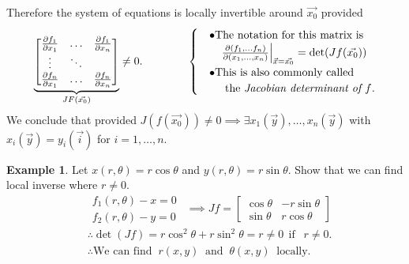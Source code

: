 \documentclass[
	12pt,
	]{article}
\theoremstyle{custom}
\theoremstyle{custom}
\theoremstyle{custom}
\theoremstyle{custom}
\theoremstyle{custom}
\theoremstyle{definition}
\newtheorem{example}{Example}[section]
\theoremstyle{example}
\theoremstyle{note}
\theoremstyle{remark}
\theoremstyle{example}
\newcounter{theo}[section]\setcounter{theo}{0}
\numberwithin{equation}{subsection}
\begin{document}
	   		 Therefore the system of equations is locally invertible around $\vec{x_{0}}$ provided 
	   		 \begin{equation*}
	   		 	\underbrace{\begin{bmatrix}
	   		 		\pdv{f_{1}}{x_{1}}(\vec{x_{0}}) & \dots & \pdv{f_{1}}{x_{n}}(\vec{x_{0}})\\
	   		 		\vdots & \ddots & \\
	   		 		\pdv{f_{n}}{x_{1}}(\vec{x_{0}}) & \dots & \pdv{f_{n}}{x_{n}}(\vec{x_{0}})
	   		 	\end{bmatrix}}_{JF(\vec{x_{0}})} \neq 0. \qquad \qquad 
	   		 	\begin{cases}
	   		 		&\bullet \text{The notation for this matrix is}\\
	   		 		& \ \ \ \eval{\pdv{(f_{1} , \dots f_{n})}{(x_{1}, \dots ,x_{n})}}_{\vec{x}= \vec{x_{0}}} = \det (Jf(\vec{x_{0}}))\\
	   		 		&\bullet \text{This is also commonly called }\\
	   		 		&\hspace{0.5cm}\text{the} \ \textit{Jacobian determinant of $f$.}
	   		 	\end{cases}
	   		 \end{equation*}
	   		 We conclude that provided $J(f(\vec{x_{0}}))\neq 0 \implies \exists x_{1}(\vec{y}), \dots ,x_{n}(\vec{y})$ with $x_{i}(\vec{y})= y_{i}(\vec{i})$ for $i=1,\dots,n$.
	   		 
	   		 \begin{example}
	   		 	Let $x(r,\theta) = r\cos \theta$ and $y(r,\theta) = r\sin\theta$. Show that we can find local inverse where $r\neq0$.
	   		 	\begin{equation*}
	   		 		\begin{align*}
		   		 		&f_{1}(r,\theta) - x = 0 \\
		   		 		&f_{2}(r, \theta)-y = 0
	   		 		\end{align*} \ \ \implies Jf = 
	   		 		\begin{bmatrix}
	   		 			\cos\theta & -r\sin\theta \\
	   		 			\sin\theta & r\cos\theta
	   		 		\end{bmatrix}
	   		 	\end{equation*}
	   		 	\begin{align*}
	   		 		&\therefore \det(Jf) = r\cos^{2}\theta + r\sin^{2} \theta =r \neq 0 \ \ \text{if } \ \ r\neq 0. \\
	   		 		&\therefore \text{We can find } \ r(x,y) \ \text{ and } \ \theta(x,y) \ \text{ locally}.
	   		 	\end{align*}
	   		 \end{example}
	   		 
\end{document}
